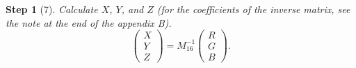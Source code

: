 \documentclass[twocolumn]{scrartcl}
\theoremstyle{named}
\newtheorem*{step}{Step}
\begin{document}
\begin{step}[7]
Calculate $X$, $Y$, and $Z$ (for the coefficients of the inverse matrix, see
the note at the end of the appendix B).  %
\[
\begin{pmatrix}X\\Y\\Z\end{pmatrix}
  = M_{16}^{-1}
\begin{pmatrix}R\\G\\B\end{pmatrix}.
\]
\end{step}



%
%
%
%
%
%
%

\printbibliography{}
\end{document}
